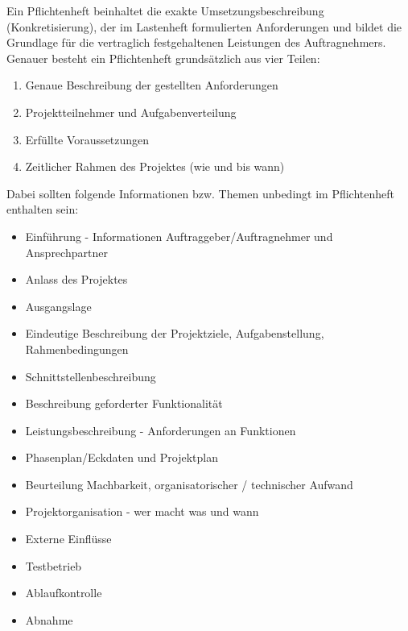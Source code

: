         \begin{loesung}\:
            Ein Pflichtenheft beinhaltet die exakte Umsetzungsbeschreibung (Konkretisierung), der im Lastenheft formulierten Anforderungen und bildet die Grundlage für die vertraglich festgehaltenen Leistungen des Auftragnehmers. Genauer besteht ein Pflichtenheft grundsätzlich aus vier Teilen:
            \\[-.7cm]\begin{enumerate}
                \setlength\itemsep{0.1px}
                \item Genaue Beschreibung der gestellten Anforderungen
                \item Projektteilnehmer und Aufgabenverteilung
                \item Erfüllte Voraussetzungen
                \item Zeitlicher Rahmen des Projektes (wie und bis wann)
            \end{enumerate}
            Dabei sollten folgende Informationen bzw. Themen unbedingt im Pflichtenheft enthalten sein:
            \\[-.7cm]\begin{itemize}
                \setlength\itemsep{0.1px}
                \item Einführung - Informationen Auftraggeber/Auftragnehmer und Ansprechpartner
                \item Anlass des Projektes
                \item Ausgangslage
                \item Eindeutige Beschreibung der Projektziele, Aufgabenstellung, Rahmenbedingungen
                \item Schnittstellenbeschreibung
                \item Beschreibung geforderter Funktionalität
                \item Leistungsbeschreibung - Anforderungen an Funktionen
                \item Phasenplan/Eckdaten und Projektplan
                \item Beurteilung Machbarkeit, organisatorischer / technischer Aufwand
                \item Projektorganisation - wer macht was und wann
                \item Externe Einflüsse
                \item Testbetrieb
                \item Ablaufkontrolle
                \item Abnahme
            \end{itemize}
        \end{loesung}


